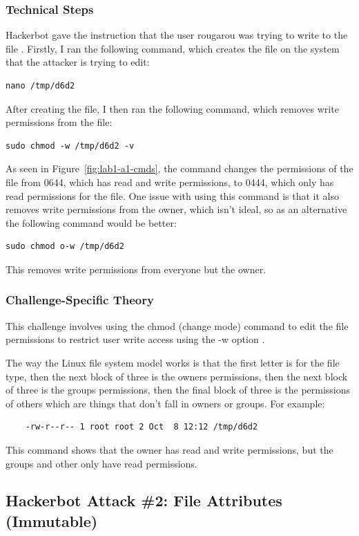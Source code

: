 \documentclass[11pt,a4paper]{article}
\newcommand{\cmd}[1]{\texttt{\detokenize{#1}}}
\begin{document}
\subsubsection{Technical Steps}
Hackerbot gave the instruction that the user rougarou was trying to write to the file \cmd{/tmp/d6d2}. Firstly, I ran the following command, which creates the file on the system that the attacker is trying to edit:
\begin{lstlisting}
nano /tmp/d6d2
\end{lstlisting}
After creating the file, I then ran the following command, which removes write permissions from the file:
\begin{lstlisting}
sudo chmod -w /tmp/d6d2 -v
\end{lstlisting}
As seen in Figure~\ref{fig:lab1-a1-cmds}, the command changes the permissions of the file from 0644, which has read and write permissions, to 0444, which only has read permissions for the file. One issue with using this command is that it also removes write permissions from the owner, which isn't ideal, so as an alternative the following command would be better:
\begin{lstlisting}
sudo chmod o-w /tmp/d6d2
\end{lstlisting}
This removes write permissions from everyone but the owner.
\subsubsection{Challenge-Specific Theory}
This challenge involves using the chmod (change mode) command to edit the file permissions to restrict user write access using the -w option \parencite{chmod_man}. 

The way the Linux file system model works is that the first letter is for the file type, then the next block of three is the owners permissions, then the next block of three is the groups permissions, then the final block of three is the permissions of others which are things that don't fall in owners or groups. For example:
\begin{lstlisting}
    -rw-r--r-- 1 root root 2 Oct  8 12:12 /tmp/d6d2
\end{lstlisting}
This command shows that  the owner has read and write permissions, but the groups and other only have read permissions.
\subsection{Hackerbot Attack \#2: File Attributes (Immutable)}
\end{document}
